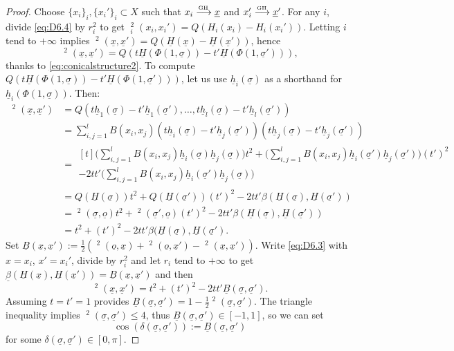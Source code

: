 \documentclass[10pt]{amsart}
\def\To#1{\mathchoice{\xrightarrow{\textstyle\kern4pt#1\kern3pt}}{\stackrel{#1}{\longrightarrow}}{}{}}
\newcommand{\sGH}{{\scriptscriptstyle\mathrm{GH}\,}}
\theoremstyle{plain}
\theoremstyle{definition}
\newcommand{\dist}{\mathsf{d}}
\newcommand{\uB}{\underline{B}}
\newcommand{\usigma}{\underline{\sigma}}
\DeclareMathOperator{\udist}{\underline{\dist}}
\newcommand{\uo}{\underline{o}}
\newcommand{\ux}{\underline{x}}
\newcommand{\uH}{\underline{H}}
\newcommand{\ubeta}{\underline{\beta}}
\newcommand{\uh}{\underline{h}}
\begin{document}
\begin{proof}
Choose $\{x_i\}_i, \{x_i'\}_i \subset X$ such that $x_i \To{\sGH} \ux$ and $x_i' \To{\sGH} \ux'$. For any $i$, divide \eqref{eq:D6.4} by $r_i^2$ to get $
\udist_i^2(x_i,x_i') = Q(H_i(x_i)-H_i(x_i'))$.
Letting $i$ tend to $+\infty$ implies $
\udist^2(\ux,\ux') = Q(\uH(\ux)-\uH(\ux'))$, hence
\[
\udist^2(\ux,\ux')
= Q(t \uH(\Phi(1,\usigma)) - t' \uH(\Phi(1,\usigma'))),
\]
thanks to \eqref{eq:conicalstructure2}. To compute $Q(t \uH(\Phi(1,\usigma)) - t' \uH(\Phi(1,\usigma')))$, let us use $\underline{h}_i(\usigma)$ as a shorthand for $\underline{h}_i(\Phi(1,\usigma))$. Then:
\begin{align*}
\udist^2(\ux,\ux') & = Q(t\uh_1(\usigma) - t' \uh_1(\usigma'), \ldots, t\uh_l(\usigma) - t' \uh_l(\usigma')) \nonumber \\
& = \sum_{i,j=1}^l B(x_i,x_j) (t\underline{h}_i(\usigma)-t'\underline{h}_j(\usigma'))(t \underline{h}_j(\usigma)-t'\underline{h}_j(\usigma')) \\
& = \begin{multlined}[t]
\biggl(\sum_{i,j=1}^l B(x_i,x_j) \uh_i(\usigma)\uh_j(\usigma)\biggr) t^2 + \biggl(\sum_{i,j=1}^l B(x_i,x_j) \uh_i(\usigma')\uh_j(\usigma')\biggr) (t')^2\\
 - 2 t t' \biggl(\sum_{i,j=1}^l B(x_i,x_j) \uh_i(\usigma')\uh_j(\usigma)\biggr)
\end{multlined}\\
& = Q(\uH(\usigma)) t^2 + Q(\uH(\usigma')) (t')^2 - 2 t t' \beta(\uH(\usigma),\uH(\usigma'))\\
& = \udist^2(\usigma,\uo)t^2 + \udist^2(\usigma',\uo) (t')^2 - 2 t t' \beta(\uH(\usigma),\uH(\usigma'))\\
& = t^2 + (t')^2 - 2 t t' \beta(\uH(\usigma),\uH(\usigma').
\end{align*}
Set $\uB(\ux,\ux'):=\frac{1}{2}(\udist^2(\uo,\ux)+\udist^2(\uo,\ux')-\udist^2(\ux,\ux'))$. Write \eqref{eq:D6.3} with $x=x_i$, $x'=x_i'$, divide by $r_i^2$ and let $r_i$ tend to $+\infty$ to get $\ubeta(\uH(\ux),\uH(\ux'))=\uB(\ux,\ux')$ and then
\begin{equation}\label{eq:coeur}
\udist^2(\ux,\ux') = t^2 + (t')^2 - 2 t t' \uB(\usigma,\usigma').
\end{equation}
Assuming $t=t'=1$ provides $\uB(\usigma,\usigma')=1-\frac{1}{2}\udist^2(\usigma,\usigma')$. The triangle inequality implies $\udist^2(\usigma,\usigma')\le 4$, thus $\uB(\usigma,\usigma') \in [-1,1]$, so we can set
\[
\cos(\delta(\usigma,\usigma')):=\uB(\usigma,\usigma')
\]
for some $\delta(\usigma,\usigma') \in [0,\pi]$.
\end{proof}
\end{document}
